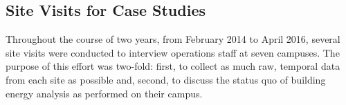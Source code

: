 \subsection{Site Visits for Case Studies}
\label{sec:sitevisit}
Throughout the course of two years, from February 2014 to April 2016, several site visits were conducted to interview operations staff at seven campuses. The purpose of this effort was two-fold: first, to collect as much raw, temporal data from each site as possible and, second, to discuss the status quo of building energy analysis as performed on their campus.
